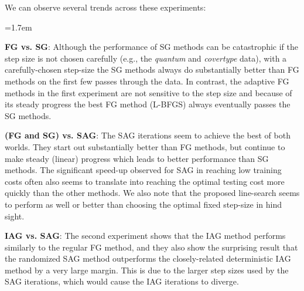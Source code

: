 \documentclass{article}
\begin{document}
We can observe several trends across these experiments:
\begin{list}{}{\leftmargin=1.7em}
   \addtolength{\itemsep}{-.215\baselineskip}
\item[--] \textbf{FG vs. SG}: Although the performance of SG methods
 can be catastrophic if the step size is not chosen carefully (e.g., the \emph{quantum} and \emph{covertype} data), with a carefully-chosen step-size
the SG methods always do substantially better than FG methods
 on the first few passes through the data.  In contrast, the adaptive
 FG methods in the first experiment are not sensitive to the step size and because of its steady progress the best FG method (L-BFGS) 
 always eventually passes the SG methods.
\item[--] \textbf{(FG and SG) vs. SAG}: The SAG iterations seem to achieve the best of both worlds.  They
start out substantially better than FG methods, but continue
to make steady (linear) progress which leads to better performance than SG
methods.
The significant speed-up observed for SAG in reaching low training costs often also seems to translate into reaching the optimal testing cost more quickly than the other methods. We also note that the proposed line-search seems to perform as well or better than choosing the optimal fixed step-size in hind sight.

\item[--] \textbf{IAG vs. SAG}: The second experiment shows that the IAG method performs similarly to the regular FG method, and they also show the surprising result that the randomized SAG method outperforms the closely-related deterministic IAG method by a very large margin.  This is due to the larger step sizes used by the SAG iterations, which would cause the IAG iterations to diverge.
\end{list}


\end{document}
